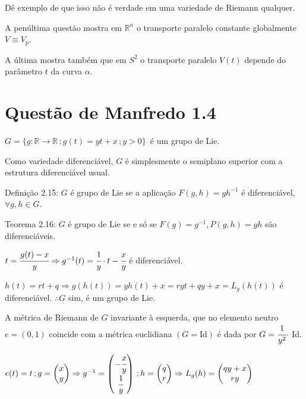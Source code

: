 \documentclass[12pt]{article}
\begin{document}
		D\^e exemplo de que isso n\~ao \'e verdade em uma variedade de Riemann qualquer.

		\vspace{3mm}

		A pen\'ultima quest\~ao mostra em $\mathbb{R}^n$ o transporte paralelo constante globalmente $V \equiv V_p$.

		A \'ultima mostra tamb\'em que em $S^2$ o transporte paralelo $V(t)$ depende do par\^ametro $t$ da curva $\alpha$.

	\section{Quest\~ao de Manfredo 1.4}
		\begin{flushright}
		\end{flushright}

		$G = \{g : \mathbb{R} \rightarrow \mathbb{R} \,; g(t) = yt + x \,; y > 0 \}\,$ \'e um grupo de Lie.

		Como variedade diferenci\'avel, $G$ \'e simplesmente o semiplano superior com a estrutura diferenci\'avel usual.

		\vspace{3mm}

		Defini\c{c}\~ao 2.15: $G$ \'e grupo de Lie se a aplica\c{c}\~ao $F(g,h) = gh^{-1}$ \'e diferenci\'avel, $\forall g,h \in G$.

		Teorema 2.16: $G$ \'e grupo de Lie se e s\'o se $F(g) = g^{-1}, P(g,h) = gh$ s\~ao diferenci\'aveis.

		$t = \cfrac{g(t) - x}{y} \Rightarrow g^{-1}(t) = \cfrac{1}{y} \cdot t - \cfrac{x}{y}$ \'e diferenci\'avel.

		$h(t) = rt + q \Rightarrow g(h(t)) = yh(t) + x = ryt + qy + x = L_g(h(t))$ \'e diferenci\'avel. $\therefore G$ sim, \'e um grupo de Lie.

		\vspace{3mm}

		A m\'etrica de Riemann de $G$ invariante \`a esquerda, que no elemento neutro $e = (0, 1)$ coincide com a m\'etrica euclidiana $(G = \text{Id})$ \'e dada por $G = \cfrac{1}{y^2} \cdot$ Id.

		\vspace{3mm}

		$e(t) = t\,;g = \left(\begin{matrix} x \\ y \end{matrix} \right) \Rightarrow g^{-1} = \left(\begin{matrix} -\cfrac{x}{y} \\ \cfrac{1}{y} \end{matrix} \right)\,;h = \left(\begin{matrix} q \\ r \end{matrix} \right) \Rightarrow L_g (h) =\left(\begin{matrix} qy + x \\ ry \end{matrix} \right)$
\end{document}
